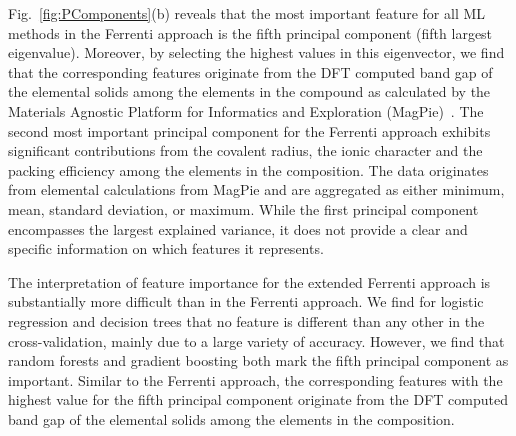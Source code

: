 \documentclass[superscriptaddress,unsortedaddress,
 amsmath,amssymb,
 aps,
]{revtex4-2}
\begin{document}
Fig.~\ref{fig:PComponents}(b) reveals that the most important feature for all ML methods in the Ferrenti approach is the fifth principal component (fifth largest eigenvalue). Moreover, by selecting the highest values in this eigenvector, we find that the corresponding features originate from the DFT computed band gap of the elemental solids among the elements in the compound as calculated by the Materials Agnostic Platform for Informatics and Exploration (MagPie)~\cite{magpie}. 
The second most important principal component for the Ferrenti approach exhibits significant contributions from the covalent radius, the ionic character and the packing efficiency among the elements in the composition. 
The data originates from elemental calculations from MagPie and are aggregated as either minimum, mean, standard deviation, or maximum. 
While the first principal component encompasses the largest explained variance, it does not provide a clear and specific information on which features it represents. 

The interpretation of feature importance for the extended Ferrenti approach is substantially more difficult than in the Ferrenti approach. We find for logistic regression and decision trees that no feature is different than any other in the cross-validation, mainly due to a large variety of accuracy. However, we find that random forests and gradient boosting both mark the fifth principal component as important. Similar to the Ferrenti approach, the corresponding features with the highest value for the fifth principal component originate from the DFT computed band gap of the elemental solids among the elements in the composition. 
\end{document}
